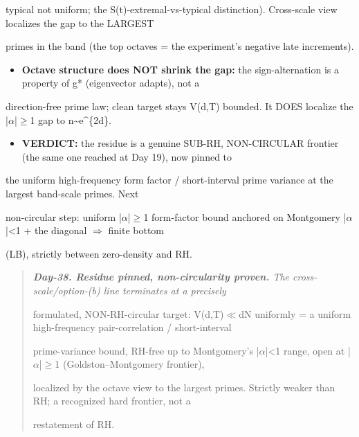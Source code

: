 \documentclass[10pt]{article}
\begin{document}
  typical not uniform; the S(t)-extremal-vs-typical distinction). Cross-scale view localizes the gap to the LARGEST\par
  primes in the band (the top octaves = the experiment's negative late increments).\par
\begin{itemize}
\item \textbf{Octave structure does NOT shrink the gap:} the sign-alternation is a property of g* (eigenvector adapts), not a
\end{itemize}
  direction-free prime law; clean target stays V(d,T) bounded. It DOES localize the |\ensuremath{\alpha}|\ensuremath{\ge}1 gap to n\textasciitilde{}e\textasciicircum{}\{2d\}.\par
\begin{itemize}
\item \textbf{VERDICT:} the residue is a genuine SUB-RH, NON-CIRCULAR frontier (the same one reached at Day 19), now pinned to
\end{itemize}
  the uniform high-frequency form factor / short-interval prime variance at the largest band-scale primes. Next\par
  non-circular step: uniform |\ensuremath{\alpha}|\ensuremath{\ge}1 form-factor bound anchored on Montgomery |\ensuremath{\alpha}|<1 + the diagonal \ensuremath{\Rightarrow} finite bottom\par
  (LB), strictly between zero-density and RH.\par

\begin{quote}\itshape
\textbf{Day-38. Residue pinned, non-circularity proven.} The cross-scale/option-(b) line terminates at a precisely\par
formulated, NON-RH-circular target: V(d,T)\ensuremath{\ll}dN uniformly = a uniform high-frequency pair-correlation / short-interval\par
prime-variance bound, RH-free up to Montgomery's |\ensuremath{\alpha}|<1 range, open at |\ensuremath{\alpha}|\ensuremath{\ge}1 (Goldston--Montgomery frontier),\par
localized by the octave view to the largest primes. Strictly weaker than RH; a recognized hard frontier, not a\par
restatement of RH.\par
\end{quote}
\end{document}
